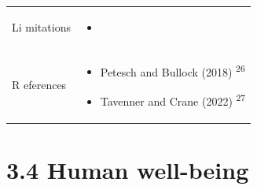 \documentclass[
  letterpaper,
  DIV=11,
  numbers=noendperiod]{scrreprt}
\providecommand{\tightlist}{%
  \setlength{\itemsep}{0pt}\setlength{\parskip}{0pt}}
\begin{document}
\begin{longtable}[]{@{}
  >{\raggedright\arraybackslash}p{}
  >{\raggedright\arraybackslash}p{}@{}}
Li mitations & \begin{minipage}[t]{\linewidth}\raggedright
\begin{itemize}
\tightlist
\item
\end{itemize}
\end{minipage} \\
R eferences & \begin{minipage}[t]{\linewidth}\raggedright
\begin{itemize}
\item
  Petesch and Bullock (2018) \textsuperscript{26}
\item
  Tavenner and Crane (2022) \textsuperscript{27}
\end{itemize}
\end{minipage} \\
\end{longtable}

\chapter{3.4 Human well-being}\label{human-well-being}
\end{document}
